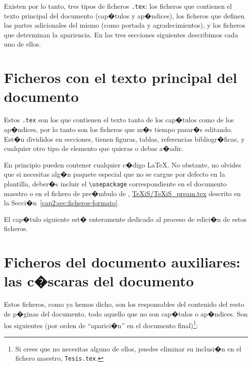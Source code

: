 Existen por lo tanto, tres tipos de ficheros \texttt{.tex}: los
ficheros que contienen el texto principal del documento (cap�tulos y
ap�ndices), los ficheros que definen las partes adicionales del mismo
(como portada y agradecimientos), y los ficheros que determinan la
apariencia. En las tres secciones siguientes describimos cada uno de
ellos.

\section{Ficheros con el texto principal del documento}
\label{cap2:sec:ficheros-texto}

Estos \texttt{.tex} son los que contienen el texto tanto de los
cap�tulos como de los ap�ndices, por lo tanto son los ficheros que m�s
tiempo pasar�s editando. Est�n divididos en secciones, tienen figuras,
tablas, referencias bibliogr�ficas, y cualquier otro tipo de elemento
que quieras o debas a�adir.

En principio pueden contener cualquier c�digo \LaTeX. No obstante, no
olvides que si necesitas alg�n paquete especial que no se cargue por
defecto en la plantilla, deber�s incluir el \verb+\usepackage+
correspondiente en el documento maestro o en el fichero de pre�mbulo
de \texis, \url{TeXiS/TeXiS\_pream.tex} descrito en la
Secci�n~\ref{cap2:sec:ficheros-formato}.

El cap�tulo siguiente est� enteramente dedicado al proceso de edici�n
de estos ficheros.

\section[Ficheros del documento auxiliares]%
{Ficheros del documento auxiliares: las c�scaras del documento}
\label{cap2:sec:ficheros-auxiliares}

Estos ficheros, como ya hemos dicho, son los responsables del
contenido del resto de p�ginas del documento, todo aquello que no son
cap�tulos o ap�ndices. Son los siguientes (por orden de ``aparici�n''
en el documento final)\footnote{Si crees que no necesitas alguno de
  ellos, puedes eliminar su inclusi�n en el fichero maestro,
  \texttt{Tesis.tex}.}:

